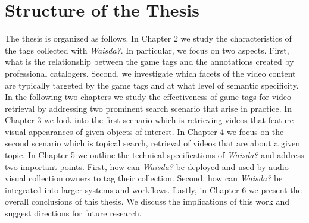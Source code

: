 \section{Structure of the Thesis}
The thesis is organized as follows. In Chapter 2 we study the characteristics of the tags collected with \textit{Waisda?}. In particular, we focus on two aspects. First, what is the relationship between the game  tags and the annotations created by professional catalogers. Second, we investigate which facets of the video content are typically targeted by the game tags and at what level of semantic specificity. In the following two chapters we study the effectiveness of game tags for video retrieval by addressing two prominent search scenario that arise in practice. In Chapter 3 we look into the first scenario which is retrieving videos that feature visual appearances of given objects of interest. In Chapter 4 we focus on the second scenario which is topical search, retrieval of videos that are about a given topic. In Chapter 5 we outline the technical specifications of \textit{Waisda?} and address two important points. First, how can \textit{Waisda?} be deployed and used by audio-visual collection owners to tag their collection. Second, how can \textit{Waisda?} be integrated into larger systems and workflows. Lastly, in Chapter 6 we present the overall conclusions of this thesis. We discuss the implications of this work and suggest directions for future research. 

